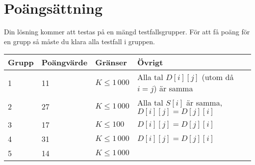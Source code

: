 \section*{Poängsättning}
Din lösning kommer att testas på en mängd testfallsgrupper. För att få poäng för en grupp
så måste du klara alla testfall i gruppen.

\begin{tabular}{| l | l | l | l |}
\hline
Grupp & Poängvärde & Gränser & Övrigt \\ \hline
	1     & 11         & $K \le 1\,000$ & Alla tal $D[i][j]$ (utom då $i = j$) är samma \\ \hline
	2     & 27         & $K \le 1\,000$ & Alla tal $S[i]$ är samma, $D[i][j] = D[j][i]$\\ \hline
	3     & 17         & $K \le 100$ & $D[i][j] = D[j][i]$ \\ \hline
	4     & 31         & $K \le 1\,000$ & $D[i][j] = D[j][i]$ \\ \hline
	5     & 14         & $K \le 1\,000$ & \\ \hline
\end{tabular}
